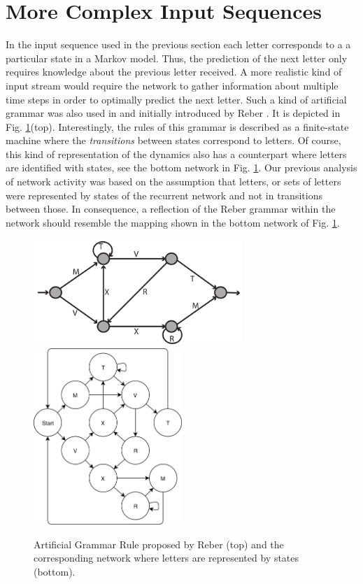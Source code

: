 \documentclass[10pt,a4paper]{article}
\begin{document}
\section{More Complex Input Sequences}
In the input sequence used in the previous section each letter corresponds to a a particular state in a Markov model. Thus, the prediction of the next letter only requires knowledge about the previous letter received. A more realistic kind of input stream would require the network to gather information about multiple time steps in order to optimally predict the next letter. Such a kind of artificial grammar was also used in \citep{Duarte_2014} and initially introduced by Reber \cite{Reber_1967}. It is depicted in Fig. \ref{fig:Reber_Grammar}(top). Interestingly, the rules of this grammar is described as a finite-state machine where the \textit{transitions} between states correspond to letters. Of course, this kind of representation of the dynamics also has a counterpart where letters are identified with states, see the bottom network in Fig. \ref{fig:Reber_Grammar}. Our previous analysis of network activity was based on the assumption that letters, or sets of letters were represented by states of the recurrent network and not in transitions between those. In consequence, a reflection of the Reber grammar within the network should resemble the mapping shown in the bottom network of Fig. \ref{fig:Reber_Grammar}. 
\begin{figure}
\includegraphics[width=0.7\textwidth]{../../plots/artif_grammar_illustration.png}
\includegraphics[width=0.5\textwidth]{../../plots/Reber_Grammar_States.png}
\caption{Artificial Grammar Rule proposed by Reber \citep{Reber_1967} (top) and the corresponding network where letters are represented by states (bottom).}
\label{fig:Reber_Grammar}
\end{figure}
\end{document}
